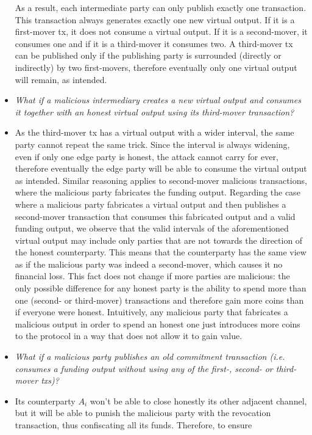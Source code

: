 \begin{itemize}
  As a result, each intermediate party can only publish exactly one transaction.
  This transaction always generates exactly one new virtual output. If it is a
  first-mover tx, it does not consume a virtual output. If it is a second-mover,
  it consumes one and if it is a third-mover it consumes two. A third-mover tx
  can be published only if the publishing party is surrounded (directly or
  indirectly) by two first-movers, therefore eventually only one virtual output
  will remain, as intended.
  \item \emph{What if a malicious intermediary creates a new virtual output and
  consumes it together with an honest virtual output using its third-mover
  transaction?}
  \item As the third-mover tx has a virtual output with a wider interval, the
  same party cannot repeat the same trick. Since the interval is always
  widening, even if only one edge party is honest, the attack cannot carry for
  ever, therefore eventually the edge party will be able to consume the virtual
  output as intended. Similar reasoning applies to second-mover malicious
  transactions, where the malicious party fabricates the funding output.
  Regarding the case where a malicious party fabricates a virtual output and
  then publishes a second-mover transaction that consumes this fabricated output
  and a valid funding output, we observe that the valid intervals of the
  aforementioned virtual output may include only parties that are not towards
  the direction of the honest counterparty. This means that the counterparty
  has the same view as if the malicious party was indeed a second-mover, which
  causes it no financial loss. This fact does not change if more parties
  are malicious: the only possible difference for any honest party is the
  ability to spend more than one (second- or third-mover) transactions and
  therefore gain more coins than if everyone were honest. Intuitively, any
  malicious party that fabricates a malicious output in order to spend an honest
  one just introduces more coins to the protocol in a way that does not allow it
  to gain value.
  \item \emph{What if a malicious party publishes an old commitment transaction
  (i.e. consumes a funding output without using any of the first-, second- or
  third-mover txs)?}
  \item Its counterparty $A_i$ won't be able to close honestly its other
  adjacent channel, but it will be able to punish the malicious party with the
  revocation transaction, thus confiscating all its funds. Therefore, to ensure

\end{itemize}
